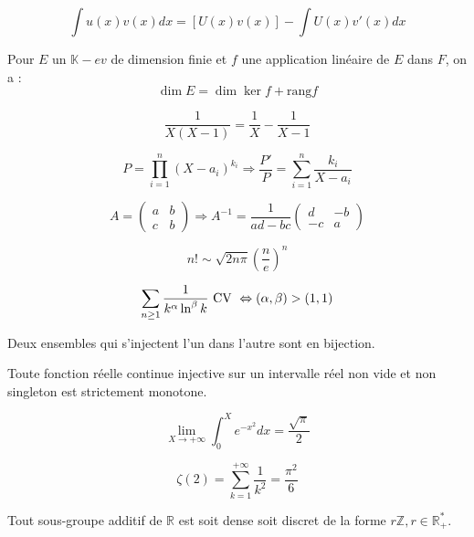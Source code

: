 \begin{lemme}\[
    \int u(x)v(x)dx = [U(x)v(x)] - \int U(x)v'(x)dx
\]\end{lemme}

\begin{theo} Pour $E$ un $\mathbb{K}-ev$ de dimension finie et $f$ une application linéaire de $E$ dans $F$, on a : \[
    \dim E = \dim\ker f + \text{rang} f
\]\end{theo}

\begin{lemme}\[
    \frac{1}{X(X-1)} = \frac{1}{X} - \frac{1}{X-1}
\]\end{lemme}

\begin{lemme}\[
    P = \prod_{i=1}^n (X-a_i)^{k_i} \Rightarrow \frac{P'}{P} = \sum_{i=1}^{n} \frac{k_i}{X-a_i}
\]\end{lemme}

\begin{lemme}\[
    A = \left(\begin{array}{cc}a & b \\ c & b\end{array}\right) \Rightarrow A^{-1} = \frac{1}{ad-bc}\left(\begin{array}{cc} d & -b\\ -c & a\end{array}\right)
\]\end{lemme}

\begin{lemme}\[
    n! \sim \sqrt{2n\pi}\left(\frac{n}{e}\right)^n
\]\end{lemme}

\begin{lemme}\[
    \sum_{n \geq 1} \frac{1}{k^\alpha\ln^\beta k} \text{ CV } \Leftrightarrow (\alpha, \beta) > (1, 1)
\]\end{lemme}

\begin{theo}
    Deux ensembles qui s'injectent l'un dans l'autre sont en bijection.
\end{theo}

\begin{theo}
    Toute fonction réelle continue injective sur un intervalle réel non vide et non singleton est strictement monotone.
\end{theo}

\begin{lemme}\[
    \lim_{X \rightarrow +\infty} \int_0^X e^{-x^2}dx = \frac{\sqrt{\pi}}{2}
\]\end{lemme}

\begin{lemme}\[
    \zeta(2) = \sum_{k=1}^{+\infty} \frac{1}{k^2} = \frac{\pi^2}{6}
\]\end{lemme}

\begin{theo}
    Tout sous-groupe additif de $\mathbb{R}$ est soit dense soit discret de la forme $r\mathbb{Z}, r\in\mathbb{R}_+^*$.
\end{theo}

